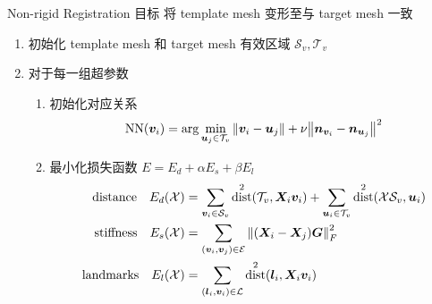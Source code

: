 \documentclass{beamer}
\DeclareMathOperator{\dist}{dist}
\begin{document}
\begin{frame}{Non-rigid Registration}
  \textcolor{tsinghua}{目标} 将 template mesh 变形至与 target mesh 一致
  \begin{enumerate}
    \item 初始化 template mesh 和 target mesh 有效区域 $\mathcal{S}_v, \mathcal{T}_v$
    \item 对于每一组超参数
          \begin{enumerate}
            \item 初始化对应关系
                  \begin{equation*}
                    \mathrm{NN}(\bm{v}_i) = \arg\min_{\bm{u}_j \in \mathcal{T}_v} \norm{\bm{v}_i - \bm{u}_j} + \nu \norm{\bm{n}_{\bm{v}_i} - \bm{n}_{\bm{u}_j}}^2
                  \end{equation*}
            \item 最小化损失函数 $E = E_d + \alpha E_s + \beta E_l$
                  \begin{align*}
                    \text{distance} \quad E_d(\mathcal{X})  & = \sum_{\bm{v}_i \in \mathcal{S}_v} \dist^2(\mathcal{T}_v, \bm{X}_i \bm{v}_i) + \sum_{\bm{u}_i \in \mathcal{T}_v} \dist^2(\mathcal{X} \mathcal{S}_v, \bm{u}_i) \\
                    \text{stiffness} \quad E_s(\mathcal{X}) & = \sum_{(\bm{v}_i, \bm{v}_j) \in \mathcal{E}} \norm{(\bm{X}_i - \bm{X}_j) \bm{G}}_F^2                                                                          \\
                    \text{landmarks} \quad E_l(\mathcal{X}) & = \sum_{(\bm{l}_i, \bm{v}_i) \in \mathcal{L}} \dist^2(\bm{l}_i, \bm{X}_i \bm{v}_i)
                  \end{align*}
          \end{enumerate}
  \end{enumerate}
\end{frame}
\end{document}
